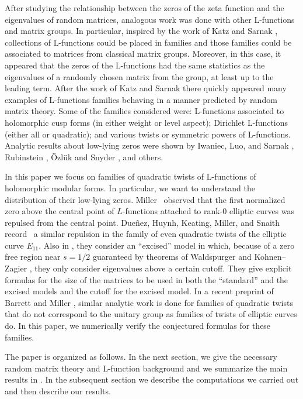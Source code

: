 \documentclass[11pt]{amsart}
\begin{document}
After studying the relationship between the zeros of the zeta function and the eigenvalues of random matrices, analogous work was done with other L-functions and matrix groups.  In particular, inspired by the work of Katz and Sarnak \cite{katzsarnak}, collections of L-functions could be placed in families and those families could be associated to matrices from classical matrix groups.  Moreover, in this case, it appeared that the zeros of the L-functions had the same statistics as the eigenvalues of a randomly chosen matrix from the group, at least up to the leading term.  After the work of Katz and Sarnak there quickly appeared many examples of L-functions families behaving in a manner predicted by random matrix theory. Some of the families considered were: L-functions associated to holomorphic cusp forms (in either weight or level aspect); Dirichlet L-functions (either all or quadratic); and various twists or symmetric powers of L-functions. Analytic results about low-lying zeros were shown by Iwaniec, Luo, and Sarnak \cite{ils}, Rubinstein \cite{rubinstein}, \"Ozl\"uk and Snyder \cite{os}, and others. 

In this paper we focus on families of quadratic twists of L-functions of holomorphic modular forms.  In particular, we want to understand the distribution of their low-lying zeros.  Miller~\cite[Figs. 3 \& 4]{miller06} observed that the first normalized zero above the central point of $L$-functions attached to rank-0 elliptic curves was repulsed from the central point. Due\~nez, Huynh, Keating, Miller, and Snaith record~\cite[Fig. 4]{DHKMS} a similar repulsion in the family of even quadratic twists of the elliptic curve $E_{11}$.  Also in \cite{DHKMS}, they consider an ``excised'' model in which, because of a zero free region near $s=1/2$ guaranteed by theorems of Waldspurger \cite{Waldspurger} and Kohnen--Zagier \cite{KZ}, they only consider eigenvalues above a certain cutoff.  They give explicit formulas for the size of the matrices to be used in both the ``standard'' and the excised models and the cutoff for the excised model.  In a recent preprint of Barrett and Miller \cite{bm}, similar analytic work is done for families of quadratic twists that do not correspond to the unitary group as families of twists of elliptic curves do.  In this paper, we numerically verify the conjectured formulas for these families.

The paper is organized as follows.  In the next section, we give the necessary random matrix theory and L-function background and we summarize the main results in \cite{bm}.  In the subsequent section we describe the computations we carried out and then describe our results.
\end{document}
